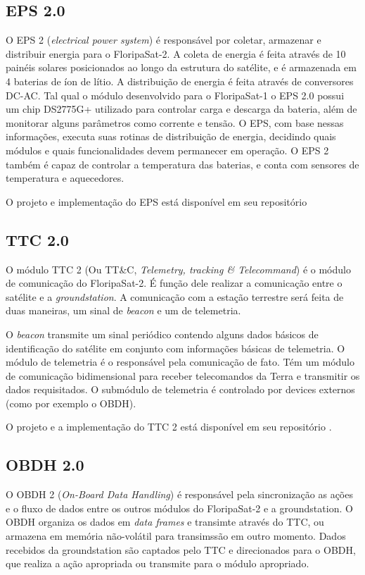         \subsection{EPS 2.0}
        \label{projeto:eps}
            O EPS 2 (\textit{electrical power system}) é responsável por coletar, armazenar e distribuir energia para o FloripaSat-2. A coleta de energia é feita através de 10 painéis solares posicionados ao longo da estrutura do satélite, e é armazenada em 4 baterias de íon de lítio. A distribuição de energia é feita através de conversores DC-AC. Tal qual o módulo desenvolvido para o FloripaSat-1\cite{marcelino2020-1} o EPS 2.0 possui um chip DS2775G+ utilizado para controlar carga e descarga da bateria, além de monitorar alguns parâmetros como corrente e tensão. O EPS, com base nessas informações, executa suas rotinas de distribuição de energia, decidindo quais módulos e quais funcionalidades devem permanecer em operação. O EPS 2 também é capaz de controlar a temperatura das baterias, e conta com sensores de temperatura e aquecedores.
            
            O projeto e implementação do EPS está disponível em seu repositório\cite{eps2-github}
            
        \subsection{TTC 2.0}
        \label{projeto:ttc}
            O módulo TTC 2 (Ou TT\&C, \textit{Telemetry, tracking \& Telecommand}) é o módulo de comunicação do FloripaSat-2. É função dele realizar a comunicação entre o satélite e a \textit{groundstation}. A comunicação com a estação terrestre será feita de duas maneiras, um sinal de \textit{beacon} e um de telemetria. 
            
            O \textit{beacon} transmite um sinal periódico contendo alguns dados básicos de identificação do satélite em conjunto com informações básicas de telemetria. O módulo de telemetria é o responsável pela comunicação de fato. Tém um módulo de comunicação bidimensional para receber telecomandos da Terra e transmitir os dados requisitados. O submódulo de telemetria é controlado por devices externos (como por exemplo o OBDH). 
            
            O projeto e a implementação do TTC 2 está disponível em seu repositório \cite{ttc2-github}.
        
        \subsection{OBDH 2.0}
        \label{projeto:obdh}
            O OBDH 2 (\textit{On-Board Data Handling}) é responsável pela sincronização as ações e o fluxo de dados entre os outros módulos do FloripaSat-2 e a groundstation. O OBDH organiza os dados em \textit{data frames} e transimte através do TTC, ou armazena em memória não-volátil para transimssão em outro momento. Dados recebidos da groundstation são captados pelo TTC e direcionados para o OBDH, que realiza a ação apropriada ou transmite para o módulo apropriado. 
            
